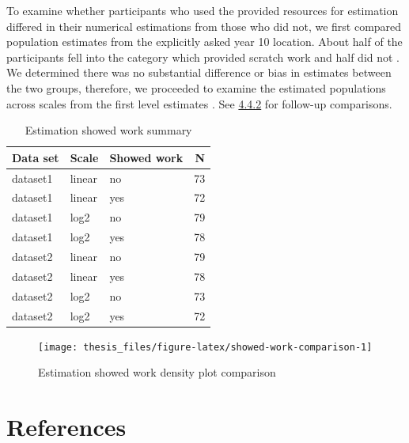 \documentclass[print]{nuthesis}
\begin{document}
To examine whether participants who used the provided resources for estimation differed in their numerical estimations from those who did not, we first compared population estimates from the explicitly asked year 10 location.
About half of the participants fell into the category which provided scratch work and half did not .
We determined there was no substantial difference or bias in estimates between the two groups, therefore, we proceeded to examine the estimated populations across scales from the first level estimates .
See \protect\hyperlink{eq1-results}{4.4.2} for follow-up comparisons.

\begin{table}

\caption{\label{tab:showed-work-comparison-table}Estimation showed work summary}
\centering
\begin{tabular}[t]{lllr}
\toprule
Data set & Scale & Showed work & N\\
\midrule
dataset1 & linear & no & 73\\
dataset1 & linear & yes & 72\\
dataset1 & log2 & no & 79\\
dataset1 & log2 & yes & 78\\
dataset2 & linear & no & 79\\
\addlinespace
dataset2 & linear & yes & 78\\
dataset2 & log2 & no & 73\\
dataset2 & log2 & yes & 72\\
\bottomrule
\end{tabular}
\end{table}

\begin{figure}[tbp]

{\centering \texttt{[image: thesis\_files/figure-latex/showed-work-comparison-1]} 

}

\caption{Estimation showed work density plot comparison}\label{fig:showed-work-comparison}
\end{figure}

\backmatter

\hypertarget{references}{%
\chapter*{References}\label{references}}
\end{document}
